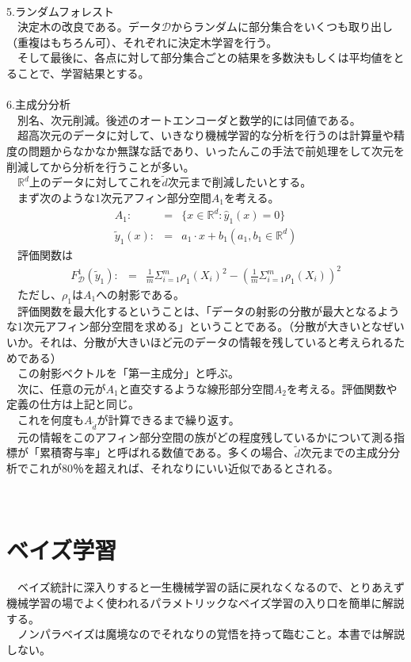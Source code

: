 \documentclass{jsarticle}
\begin{document}
　\\
5.ランダムフォレスト\\
　決定木の改良である。データ$\mathcal{D}$からランダムに部分集合をいくつも取り出し（重複はもちろん可）、それぞれに決定木学習を行う。\\
　そして最後に、各点に対して部分集合ごとの結果を多数決もしくは平均値をとることで、学習結果とする。\\
　\\
6.主成分分析\\
　別名、次元削減。後述のオートエンコーダと数学的には同値である。\\
　超高次元のデータに対して、いきなり機械学習的な分析を行うのは計算量や精度の問題からなかなか無謀な話であり、いったんこの手法で前処理をして次元を削減してから分析を行うことが多い。\\
　$\mathbb{R}^d$上のデータに対してこれを$\tilde{d}$次元まで削減したいとする。\\
　まず次のような1次元アフィン部分空間$A_1$を考える。
\begin{eqnarray}
A_1:&=&\{x\in\mathbb{R}^d:\hat{y}_1(x)=0\}\\
\tilde{y}_1(x):&=&a_1\cdot x+b_1  (a_1,b_1\in\mathbb{R}^d)
\end{eqnarray}
　評価関数は
\begin{eqnarray}
F^1_\mathcal{D}(\tilde{y}_1):&=&\frac{1}{m}\Sigma_{i=1}^m \rho_1(X_i)^2-(\frac{1}{m}\Sigma_{i=1}^m \rho_1(X_i))^2
\end{eqnarray}
　ただし、$\rho_1$は$A_1$への射影である。\\
　評価関数を最大化するということは、「データの射影の分散が最大となるような1次元アフィン部分空間を求める」ということである。（分散が大きいとなぜいいか。それは、分散が大きいほど元のデータの情報を残していると考えられるためである）\\
　この射影ベクトルを「第一主成分」と呼ぶ。\\
　次に、任意の元が$A_1$と直交するような線形部分空間$A_2$を考える。評価関数や定義の仕方は上記と同じ。\\
　これを何度も$A_{\tilde{d}}$が計算できるまで繰り返す。\\
　元の情報をこのアフィン部分空間の族がどの程度残しているかについて測る指標が「累積寄与率」と呼ばれる数値である。多くの場合、$\tilde{d}$次元までの主成分分析でこれが80％を超えれば、それなりにいい近似であるとされる。


\newpage
\scalebox{1.1}{3.実装について}\\
\newpage
\section{ベイズ学習}
　ベイズ統計に深入りすると一生機械学習の話に戻れなくなるので、とりあえず機械学習の場でよく使われるパラメトリックなベイズ学習の入り口を簡単に解説する。\\
　ノンパラベイズは魔境なのでそれなりの覚悟を持って臨むこと。本書では解説しない。\\
\end{document}
